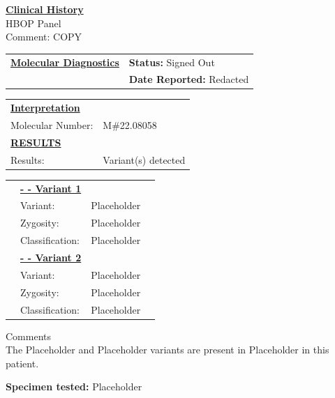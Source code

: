 \documentclass[9pt]{extarticle}
\begin{document}
\begin{raggedright}{\bf \underline{Clinical History}}\\
HBOP Panel \\
Comment: COPY
\end{raggedright}

\begin{tabular}{p{10 cm} p{4.5cm}}
{\bf \underline{Molecular Diagnostics}} & {\bf Status:} Signed Out \\
& {\bf Date Reported:} Redacted
\end{tabular}
\newline
\begin{tabular}{p{4cm} p{4 cm}}
\underline{\bf Interpretation} & \\
Molecular Number: & M\#22.08058 \\
{\bf \underline {RESULTS}} & \\
Results: & Variant(s) detected
\end {tabular}

\begin{tabular}{p{0cm} p{2 cm}p{2cm} p{10cm}}\\
& {\bf \underline{- - Variant 1}} & \\
& Variant: & Placeholder \\
& Zygosity: & Placeholder \\
& Classification: & Placeholder\\
& {\bf \underline{- - Variant 2}} & \\
& Variant: & Placeholder \\
& Zygosity: & Placeholder \\
& Classification: & Placeholder
\end{tabular}

\begin{flushleft}
Comments \\
The Placeholder and Placeholder variants are present in Placeholder in this patient. 
\end{flushleft}

\thispagestyle{empty} %
\pagestyle{fancy}

\begin{flushleft}
{\bf Specimen tested: } Placeholder
\end{flushleft}
\end{document}

